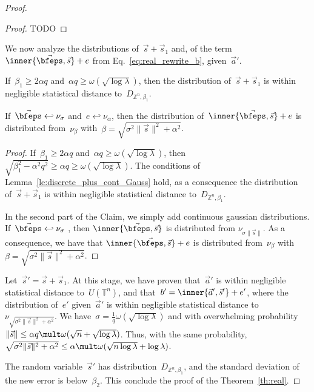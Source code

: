 \begin{proof}
\begin{proof}
TODO
\end{proof}

We now analyze the distributions of~$\vec{s} + \vec{s}_1$ and, of the term~$\inner{\vec{\bfeps},\vec{s}} + e $ from Eq.~\eqref{eq:real_rewrite_b}, given~$\vec{a}'$.

\begin{claim}
\label{cl:real_right_side}
  If~$\beta_1 \geq 2 \alpha q$ and~$\alpha q \geq \omega ( \sqrt{\log \lambda})$, then the distribution of~$\vec{s} + \vec{s}_1$
is within negligible statistical distance to~$D_{\mathbb{Z}^n,\beta_1} $.

If~$\vec{\bfeps} \hookleftarrow \nu_{\sigma}$ and~$e \hookleftarrow \nu_{\alpha}$, then the
  distribution of~$ \inner{\vec{\bfeps},\vec{s}} + e$ is distributed from~$\nu_{\beta}$ with~$\beta=\sqrt{\sigma^2\|\vec{s}\|^2+ \alpha^2}$.

\end{claim}

\begin{proof}
 If~$\beta_1 \geq 2 \alpha q$ and~$\alpha q \geq \omega ( \sqrt{\log \lambda})$, then~$\sqrt{\beta_1^2 - \alpha^2 q^2} \geq \alpha q \geq \omega ( \sqrt{\log \lambda})$. The conditions of Lemma~\ref{le:discrete_plus_cont_Gauss} hold, as a consequence the distribution of~$\vec{s} + \vec{s}_1$ is within negligible statistical distance to~$D_{\mathbb{Z}^n,\beta_1} $.


In the second part of the Claim, we simply add continuous gaussian distributions.
If~$\vec{\bfeps} \hookleftarrow \nu_{\sigma}$ , then $\inner{\vec{\bfeps},\vec{s}}$ is distributed from 
$\nu_{\sigma\|\vec{s}\|}$. As a consequence, we have that $ \inner{\vec{\bfeps},\vec{s}} + e$ is distributed from~$\nu_{\beta}$ with~$\beta=\sqrt{\sigma^2\|\vec{s}\|^2+ \alpha^2}$.
\end{proof}

Let~$\vec{s}' = \vec{s} + \vec{s}_1$.
At this stage, we have proven that~$\vec{a}'$ is within negligible statistical distance to~$U(\mathbb{T}^n)$, and that~$b' = \inner{\vec{a}',\vec{s}'} + e'$, where the distribution of~$e'$ given~$\vec{a}'$ is within negligible statistical distance
to~$\nu_{\sqrt{\sigma^2\|\vec{s}\|^2+ \alpha^2}}$. We have~$\sigma = \frac{1}{q} \omega (\sqrt{\log \lambda})$ and with overwhelming probability~$ \Vert \vec{s} \Vert \leq \alpha q \mult \omega(\sqrt{n} + \sqrt{\log \lambda})$.
Thus, with the same probability, $\sqrt{\sigma^2\|\vec{s}\|^2+ \alpha^2} \leq \alpha \mult \omega(\sqrt{n \log \lambda} + \log \lambda)$.

The random variable~$\vec{s}'$ has distribution~$D_{\mathbb{Z}^n,\beta_1}$, and the standard deviation of the new error is below~$\beta_2$. This conclude the proof of the Theorem~\ref{th:real}.


\end{proof}

